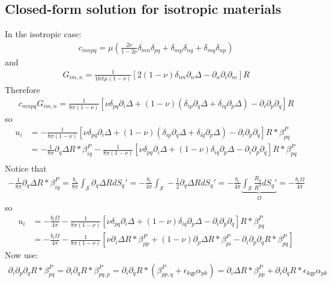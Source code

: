 \documentclass[10pt]{report}
\begin{document}
{\subsection{Closed-form solution for isotropic materials}
In the isotropic case:
\begin{align}
c_{mnpq}=\mu\left(\frac{2\nu}{1-2\nu}\delta_{mn}\delta_{pq}+\delta_{mp}\delta_{nq}+\delta_{mq}\delta_{np}\right)
\end{align}
and
\begin{align}
G_{im,n}=\frac{1}{16\pi \mu(1-\nu)}\left[2(1-\nu)\delta_{im}\partial_n\Delta-\partial_n\partial_i\partial_m\right]R
\end{align}
Therefore
\begin{align}
c_{mnpq}G_{im,n}=\frac{1}{8\pi(1-\nu)}\left[\nu\delta_{pq}\partial_i\Delta+(1-\nu)\left(\delta_{ip}\partial_q\Delta+\delta_{iq}\partial_p\Delta\right)-\partial_i\partial_p\partial_q\right]R
\end{align}
so
\begin{align}
u_i&=-\frac{1}{8\pi(1-\nu)}\left[\nu\delta_{pq}\partial_i\Delta+(1-\nu)\left(\delta_{ip}\partial_q\Delta+\delta_{iq}\partial_p\Delta\right)-\partial_i\partial_p\partial_q\right]R * \beta^P_{pq}\nonumber\\
&=-\frac{1}{8\pi}\partial_q\Delta R* \beta^P_{iq}-\frac{1}{8\pi(1-\nu)}\left[\nu\delta_{pq}\partial_i\Delta+(1-\nu)\delta_{iq}\partial_p\Delta-\partial_i\partial_p\partial_q\right]R * \beta^P_{pq}\nonumber\\
\end{align}
Notice that
\begin{align}
-\frac{1}{8\pi}\partial_q\Delta R* \beta^P_{iq}=\frac{b_i}{8\pi}\int_\mathcal{S} \partial_q\Delta R dS_q'=-\frac{b_i}{4\pi}\int_\mathcal{S} -\frac{1}{2}\partial_q\Delta R dS_q'=-\frac{b_i}{4\pi}\underbrace{\int_\mathcal{S} \frac{R_q}{R^3} dS_q'}_{\Omega}=-\frac{b_i\Omega}{4\pi}
\end{align}
so
\begin{align}
u_i&=-\frac{b_i\Omega}{4\pi}-\frac{1}{8\pi(1-\nu)}\left[\nu\delta_{pq}\partial_i\Delta+(1-\nu)\delta_{iq}\partial_p\Delta-\partial_i\partial_p\partial_q\right]R * \beta^P_{pq}\nonumber\\
&=-\frac{b_i\Omega}{4\pi}-\frac{1}{8\pi(1-\nu)}\left[\nu\partial_i\Delta R * \beta^P_{pp}+(1-\nu)\partial_p\Delta R * \beta^P_{pi}-\partial_i\partial_p\partial_q R * \beta^P_{pq}\right]
\end{align}
Now use: 
\begin{align}
\partial_i\partial_p\partial_q R * \beta^P_{pq} = \partial_i\partial_q R * \beta^P_{pq,p} = \partial_i\partial_q R * \left(\beta^P_{pp,q}+\epsilon_{kqp}\alpha_{pk}\right)=  \partial_i\Delta R * \beta^P_{pp}+ \partial_i\partial_q R * \epsilon_{kqp}\alpha_{pk}\\

\end{align}}
\end{document}
